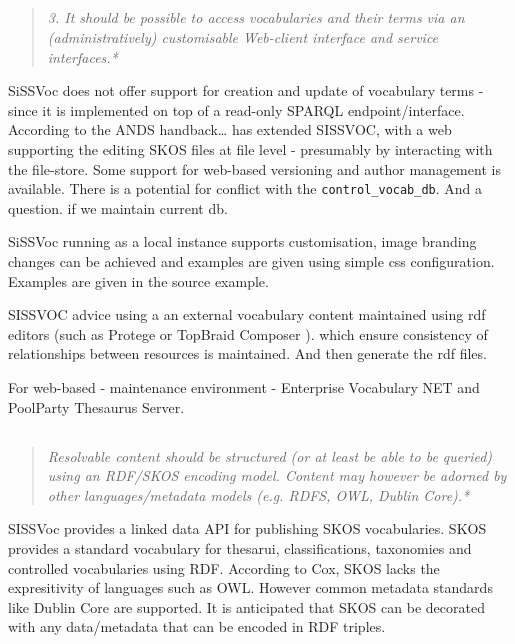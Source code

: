 \documentclass[10pt,a4paper]{article}
\newenvironment{italicquotes}
{\begin{quote}\itshape}
{\end{quote}}
\begin{document}
\begin{flushleft}
\subsection{} 
\begin{italicquotes} 
3. It should be possible to access vocabularies and their terms via an 
(administratively) customisable Web-client interface and service interfaces.*

\end{italicquotes} 

SiSSVoc does not offer support for creation and update of vocabulary terms - 
since it is implemented on top of a read-only SPARQL endpoint/interface.  
According to the ANDS handback… has extended SISSVOC, with a web supporting 
the editing SKOS files at file level - presumably by interacting with the 
file-store. Some support for web-based versioning and author management is 
available. There is a potential for conflict with the \texttt{control\_vocab\_db}. And a 
question. if we maintain current db.
 
SiSSVoc running as a local instance supports customisation, image branding 
changes can be achieved and examples are given using simple css configuration. 
Examples are given in the source example.


SISSVOC advice using a an external vocabulary content maintained using rdf 
editors (such as Protege or TopBraid Composer ). which ensure consistency of 
relationships between resources is maintained. And then generate the rdf files. 

For web-based - maintenance environment - Enterprise Vocabulary NET and 
PoolParty Thesaurus Server. 




\subsection{} 
\begin{italicquotes} 
  Resolvable content should be structured (or at least be able to be queried) 
  using an RDF/SKOS encoding model. Content may however be adorned by other 
  languages/metadata models (e.g. RDFS, OWL, Dublin Core).* 
\end{italicquotes} 
  

  SISSVoc provides a linked data API for publishing SKOS vocabularies. SKOS 
  provides a standard vocabulary for thesarui, classifications, taxonomies and 
  controlled vocabularies using RDF. According to Cox, SKOS lacks the 
  expresitivity of languages such as OWL. However common metadata standards like 
  Dublin Core are supported. It is anticipated that SKOS can be decorated with 
  any data/metadata that can be encoded in RDF triples. 


\end{flushleft}
\end{document}
